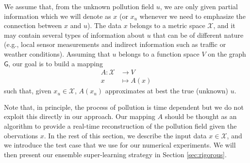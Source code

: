 \documentclass[11pt,a4paper,twoside]{article}
\theoremstyle{definition}
\numberwithin{equation}{section}
\newcommand{\cX}{\ensuremath{\mathcal{X}}}
\newcommand{\G}{\ensuremath{\textsf{G}}} %
\newcommand{\<}{\langle}
\renewcommand{\>}{\rangle}
\begin{document}
We assume that, from the unknown pollution field $u$, we are only given partial information which we will denote as $x$ (or $x_u$ whenever we need to emphasize the connection between $x$ and $u$). The data $x$ belongs to a metric space $\cX$, and it may contain several types of information about $u$ that can be of different nature (e.g., local sensor measurements and indirect information such as traffic or weather conditions). Assuming that $u$ belongs to a function space $V$ on the graph $\G$, our goal is to build a mapping
\begin{align*}
A: \cX &\to V \\
x &\mapsto A(x)
\end{align*}
such that, given $x_u\in \cX$, $A(x_u)$ approximates at best the true (unknown) $u$.

Note that, in  principle, the process of pollution is time dependent but we do not exploit this directly in our approach. Our mapping $A$ should be thought as an algorithm to provide a real-time reconstruction of the pollution field given the obervations $x$. In the rest of this section, we describe the input data $x\in \cX$, and we introduce the test case that we use for our numerical experiments. We will then present our ensemble super-learning strategy in Section \ref{sec:rigorous}.

\end{document}

